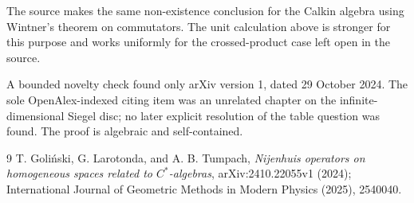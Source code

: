 \documentclass[11pt]{article}
\begin{document}
The source makes the same non-existence conclusion for the Calkin algebra
using Wintner's theorem on commutators.  The unit calculation above is
stronger for this purpose and works uniformly for the crossed-product case
left open in the source.

A bounded novelty check found only arXiv version 1, dated 29 October 2024.
The sole OpenAlex-indexed citing item was an unrelated chapter on the
infinite-dimensional Siegel disc; no later explicit resolution of the
table question was found.  The proof is algebraic and self-contained.

\begin{thebibliography}{9}
T. Goli\'nski, G. Larotonda, and A. B. Tumpach,
\emph{Nijenhuis operators on homogeneous spaces related to
$C^*$-algebras}, arXiv:2410.22055v1 (2024); International Journal of
Geometric Methods in Modern Physics (2025), 2540040.
\end{thebibliography}
\end{document}
